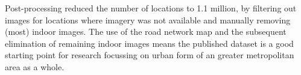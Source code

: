 \documentclass[final,3p,times,authoryear]{elsarticle}
\begin{document}
Post-processing reduced the number of locations to 1.1 million, by filtering out images for locations where imagery was not available and manually removing (most) indoor images. The use of the road network map and the subsequent elimination of remaining indoor images means the published dataset is a good starting point for research focussing on urban form of an greater metropolitan area as a whole.

 


\appendix
\setcounter{table}{0}
\renewcommand{\thetable}{A\arabic{table}}
\end{document}
